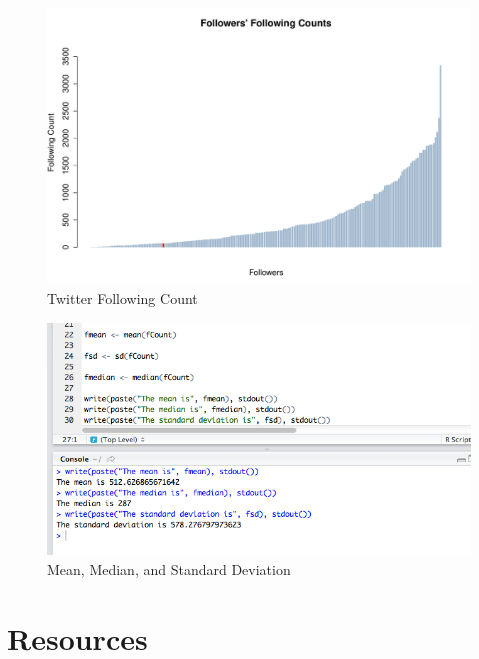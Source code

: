 \documentclass{article}
\begin{document}
\begin{figure}[H]
\centering
\includegraphics[scale=0.40]{e2/FollowingCountGraph}
\caption{Twitter Following Count}
\label{followingcounts}
\end{figure}

\begin{figure}[H]
\centering
\includegraphics[scale=0.50]{e2/statsoutput}
\caption{Mean, Median, and Standard Deviation}
\label{statsoutputfollowing}
\end{figure}


\clearpage

\section*{Resources}
\end{document}
